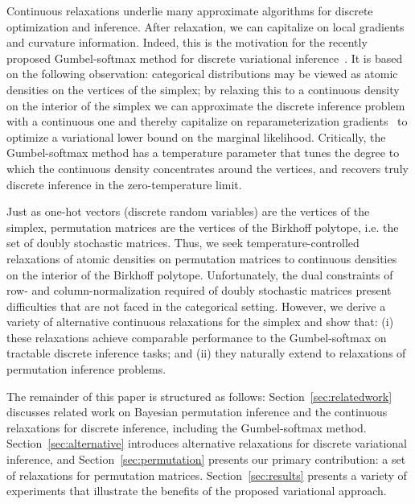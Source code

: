 \documentclass[twoside]{article}
\begin{document}
Continuous relaxations underlie many approximate algorithms for
discrete optimization and inference.  After relaxation, we can
capitalize on local gradients and curvature information. Indeed, this
is the motivation for the recently proposed Gumbel-softmax method for
discrete variational inference~\citep{jang2016categorical,
  maddison2016concrete}.  It is based on the following observation:
categorical distributions may be viewed as atomic densities
on the vertices of the simplex; by relaxing this to a continuous
density on the interior of the simplex we can approximate the discrete
inference problem with a continuous one and thereby capitalize on
reparameterization gradients~\citep{Kingma2014, rezende2014stochastic}
to optimize a variational lower bound on the marginal likelihood.
Critically, the Gumbel-softmax method has a temperature parameter that
tunes the degree to which the continuous density concentrates around
the vertices, and recovers truly discrete inference in the
zero-temperature limit.

Just as one-hot vectors (discrete random variables) are the vertices
of the simplex, permutation matrices are the vertices of the Birkhoff
polytope, i.e. the set of doubly stochastic matrices.  Thus, we seek
temperature-controlled relaxations of atomic densities on permutation
matrices to continuous densities on the interior of the Birkhoff
polytope.  Unfortunately, the dual constraints of row- and
column-normalization required of doubly stochastic matrices present
difficulties that are not faced in the categorical setting. However,
we derive a variety of alternative continuous relaxations for the
simplex and show that: (i) these relaxations achieve comparable
performance to the Gumbel-softmax on tractable discrete inference
tasks; and (ii) they naturally extend to relaxations of permutation
inference problems.

The remainder of this paper is structured as follows:
Section~\ref{sec:relatedwork} discusses related work on Bayesian
permutation inference and the continuous relaxations for discrete
inference, including the Gumbel-softmax method.
Section~\ref{sec:alternative} introduces alternative relaxations for
discrete variational inference, and Section~\ref{sec:permutation}
presents our primary contribution: a set of relaxations for
permutation matrices. Section~\ref{sec:results} presents a variety of
experiments that illustrate the benefits of the proposed variational
approach.
  
\end{document}
